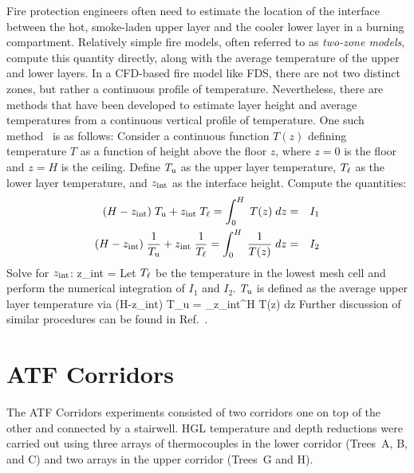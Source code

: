 Fire protection engineers often need to estimate the location of the interface between the hot, smoke-laden upper layer and the cooler lower layer in a burning compartment.  Relatively simple fire models, often referred to as {\em two-zone models}, compute this quantity directly, along with the average temperature of the upper and lower layers.  In a CFD-based fire model like FDS, there are not two distinct zones, but rather a continuous profile of temperature. Nevertheless, there are methods that have been developed to estimate layer height and average temperatures from a continuous vertical profile of temperature. One such method~\cite{Janssens:JFS1992} is as follows: Consider a continuous function $T(z)$ defining temperature $T$ as a function of height above the floor $z$, where $z=0$ is the floor and $z=H$ is the ceiling. Define $T_{\rm u}$ as the upper layer temperature, $T_{\rm \ell}$ as the lower layer temperature, and $z_{\rm int}$ as the interface height. Compute the quantities:
\begin{eqnarray*} (H-z_{\rm int})\; T_{\rm u} + z_{\rm int} \; T_{\rm \ell} = \int_0^H \; T(z) \; dz &=& I_1 \\
                  (H-z_{\rm int})\; \frac{1}{T_{\rm u}} + z_{\rm int} \; \frac{1}{T_{\rm \ell}} = \int_0^H \; \frac{1}{T(z)} \; dz &=& I_2 \end{eqnarray*}
Solve for $z_{\rm int}$:
\be
   z_{\rm int} = 
\ee
Let $T_{\rm \ell}$ be the temperature in the lowest mesh cell and perform the numerical integration of $I_1$ and $I_2$. $T_{\rm u}$ is defined as the average upper layer temperature via
\be
   (H-z_{\rm int})\; T_{\rm u} = \int_{z_{\rm int}}^H \; T(z) \; dz
\ee
Further discussion of similar procedures can be found in Ref.~\cite{He:1}.

\newpage


\section{ATF Corridors}

The ATF Corridors experiments consisted of two corridors one on top of the other and connected by a stairwell. HGL temperature and depth reductions were carried out using three arrays of thermocouples in the lower corridor (Trees~A, B, and C) and two arrays in the upper corridor (Trees~G and H).

